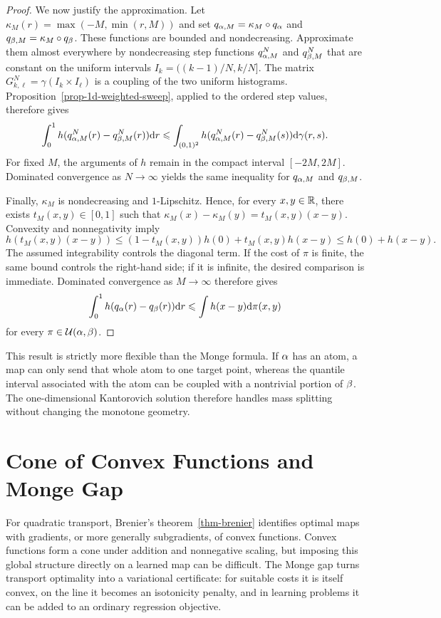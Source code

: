 \begin{proof}
		We now justify the approximation. Let $\kappa_M(r)=\max(-M,\min(r,M))$ and set $q_{\alpha,M}=\kappa_M\circ q_\alpha$ and $q_{\beta,M}=\kappa_M\circ q_\beta$. These functions are bounded and nondecreasing. Approximate them almost everywhere by nondecreasing step functions $q_{\alpha,M}^N$ and $q_{\beta,M}^N$ that are constant on the uniform intervals $I_k=((k-1)/N,k/N]$. The matrix
		\(G_{k,\ell}^N=\gamma(I_k\times I_\ell)\)
		is a coupling of the two uniform histograms. Proposition~\ref{prop-1d-weighted-sweep}, applied to the ordered step values, therefore gives
		\[
			\int_0^1 h(q_{\alpha,M}^N(r)-q_{\beta,M}^N(r))\mathrm{d} r
			\leqslant
			\int_{(0,1)^2}h(q_{\alpha,M}^N(r)-q_{\beta,M}^N(s))\mathrm{d}\gamma(r,s).
		\]
		For fixed $M$, the arguments of $h$ remain in the compact interval $[-2M,2M]$. Dominated convergence as $N\to\infty$ yields the same inequality for $q_{\alpha,M}$ and $q_{\beta,M}$.

		Finally, $\kappa_M$ is nondecreasing and $1$-Lipschitz. Hence, for every $x,y\in\mathbb{R}$, there exists $t_M(x,y)\in[0,1]$ such that
		\(\kappa_M(x)-\kappa_M(y)=t_M(x,y)(x-y)\).
		Convexity and nonnegativity imply
		\[
			h(t_M(x,y)(x-y))
			\leq
			(1-t_M(x,y))h(0)+t_M(x,y)h(x-y)
			\leq h(0)+h(x-y).
		\]
		The assumed integrability controls the diagonal term. If the cost of $\pi$ is finite, the same bound controls the right-hand side; if it is infinite, the desired comparison is immediate. Dominated convergence as $M\to\infty$ therefore gives
	\[
		\int_0^1 h(q_\alpha(r)-q_\beta(r))\mathrm{d} r
		\leqslant
		\int h(x-y)\mathrm{d}\pi(x,y)
	\]
	for every $\pi\in\mathcal{U}(\alpha,\beta)$.
\end{proof}

This result is strictly more flexible than the Monge formula. If $\alpha$ has an atom, a map can only send that whole atom to one target point, whereas the quantile interval associated with the atom can be coupled with a nontrivial portion of $\beta$. The one-dimensional Kantorovich solution therefore handles mass splitting without changing the monotone geometry.

\section{Cone of Convex Functions and Monge Gap}
\label{sec-monge-gap}

For quadratic transport, Brenier's theorem~\ref{thm-brenier} identifies optimal maps with gradients, or more generally subgradients, of convex functions. Convex functions form a cone under addition and nonnegative scaling, but imposing this global structure directly on a learned map can be difficult. The Monge gap turns transport optimality into a variational certificate: for suitable costs it is itself convex, on the line it becomes an isotonicity penalty, and in learning problems it can be added to an ordinary regression objective.

